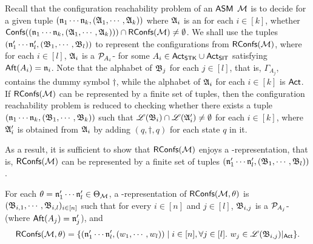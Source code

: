 Recall that the configuration reachability problem of an $\textsf{ASM}$ ${\mathcal{M} }$ is to decide for a given tuple $(\mathfrak{n}_1 \cdots \mathfrak{n}_k, ({\mathfrak{A} }_1,\cdots, {\mathfrak{A} }_k))$ where ${\mathfrak{A} }_i$ is an {\NFA} for each $i \in [k]$, whether ${\mathsf{Confs} }((\mathfrak{n}_1 \cdots \mathfrak{n}_k, ({\mathfrak{A} }_1,\cdots, {\mathfrak{A} }_k))) \cap \mathsf{RConfs}({\mathcal{M} }) \neq \emptyset$. 
%
We shall use the tuples $(\mathfrak{n}'_1 \cdots \mathfrak{n}'_l, ({\mathfrak{B} }_{1},\cdots,{\mathfrak{B} }_{l}))$ to represent the configurations from $\mathsf{RConfs}({\mathcal{M} })$, where for each $i \in [l]$, ${\mathfrak{A} }_i$ is a ${\mathcal{P} }_{A_i}$-{\WOTrNFA} for some $A_i \in {\sf Act}_{\sf STK} \cup {\sf Act}_{\sf SIT}$ satisfying ${\sf Aft}(A_i) = \mathfrak{n}_i$.  Note that the alphabet of ${\mathfrak{B} }_{j}$ for each $j \in [l]$, that is, $\Gamma_{A_j}$, contains the dummy symbol $\dag$,  while the alphabet of ${\mathfrak{A} }_i$  for each $i \in [k]$ is ${\sf Act}$. If $\mathsf{RConfs}({\mathcal{M} })$ can be represented by a finite set of tuples, then the configuration reachability problem is reduced to checking whether there exists a tuple $(\mathfrak{n}_1 \cdots \mathfrak{n}_k, ({\mathfrak{B} }_{1},\cdots,{\mathfrak{B} }_{k}))$ such that ${\mathscr{L} }({\mathfrak{B} }_i) \cap {\mathscr{L} }({\mathfrak{A} }'_i) \neq \emptyset$ for each $i \in [k]$, where ${\mathfrak{A} }'_i$ is obtained from ${\mathfrak{A} }_i$ by adding $(q, \dag, q)$ for each state $q$ in it. 

As a result, it is sufficient to show that $\mathsf{RConfs}({\mathcal{M} })$ enjoys a {\WOTrNFA}-representation, that is, $\mathsf{RConfs}({\mathcal{M} })$ can be represented by a finite set of tuples $(\mathfrak{n}'_1 \cdots \mathfrak{n}'_l, ({\mathfrak{B} }_{1},\cdots,{\mathfrak{B} }_{l}))$. 

\begin{definition}
    For each $\theta = \mathfrak{n}'_1 \cdots \mathfrak{n}'_l \in \Theta_{\mathcal{M} }$, a {\WOTrNFA}-representation of $\mathsf{RConfs}({\mathcal{M} }, \theta)$ is $({\mathfrak{B} }_{i, 1},\cdots,{\mathfrak{B} }_{i, l})_{i \in [n]}$ such that for every $i \in [n]$ and $j \in [l]$,  ${\mathfrak{B} }_{i, j}$ is a ${\mathcal{P} }_{A_j}$-{\WOTrNFA} (where ${\sf Aft}(A_j) = \mathfrak{n}'_j$), and 
    $$\RConfs(\Mm, \theta) =\{(\aname'_1 \cdots \aname'_{l}, (w_1, \cdots, w_{l})) \mid  i \in [n], \forall j \in [l].\ w_j \in \Lang(\AutB_{i, j})|_{\act}\}.$$
\end{definition}


